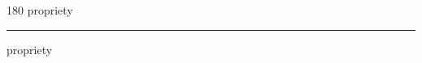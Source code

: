 
\begin{frame}
\begin{center}
\begin{turn}{180}
{\fontsize{2.5cm}{1em}\selectfont propriety}
\end{turn}
\vspace{1em}\par  
\hrule
\vspace{1em}\par  
{\fontsize{2.5cm}{1em}\selectfont propriety}
\end{center}
\end{frame}
